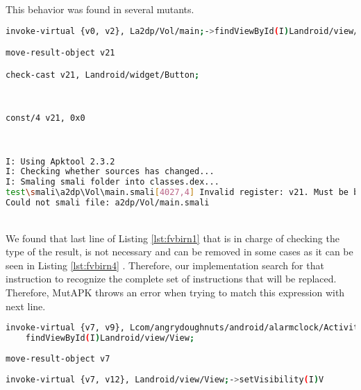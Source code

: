 This behavior was found in several mutants.

\begin{minipage}{\textwidth}
	\begin{lstlisting}[language={sh}, label={lst:fvbirn1}, caption={SMALI representation of findByViewID method call}, numbers=none]
invoke-virtual {v0, v2}, La2dp/Vol/main;->findViewById(I)Landroid/view/View;

move-result-object v21

check-cast v21, Landroid/widget/Button;
	\end{lstlisting}
\end{minipage}\\

\begin{minipage}{\textwidth}
	\begin{lstlisting}[language={sh}, label={lst:fvbirn2}, caption={SMALI representation of a null value being assigned}, numbers=none]
const/4 v21, 0x0
	\end{lstlisting}
\end{minipage}\\

\begin{minipage}{\textwidth}
	\begin{lstlisting}[language={sh}, label={lst:fvbirn3}, caption={APKTool console response}, numbers=none]
I: Using Apktool 2.3.2
I: Checking whether sources has changed...
I: Smaling smali folder into classes.dex...
test\smali\a2dp\Vol\main.smali[4027,4] Invalid register: v21. Must be between v0 and v15, inclusive.
Could not smali file: a2dp/Vol/main.smali
	\end{lstlisting}
\end{minipage}\\

We found that last line of Listing \ref{lst:fvbirn1} that is in charge of checking the type of the result, is not necessary and can be removed in some cases as it can be seen in Listing \ref{lst:fvbirn4} . Therefore, our implementation search for that instruction to recognize the complete set of instructions that will be replaced. Therefore, MutAPK throws an error when trying to match this expression with next line.

\begin{minipage}{\textwidth}
	\begin{lstlisting}[language={sh}, label={lst:fvbirn4}, caption={APKTool console response}, numbers=none]
invoke-virtual {v7, v9}, Lcom/angrydoughnuts/android/alarmclock/ActivityAlarmNotification;->
	findViewById(I)Landroid/view/View;
	
move-result-object v7
	
invoke-virtual {v7, v12}, Landroid/view/View;->setVisibility(I)V
	\end{lstlisting}
\end{minipage}\\

